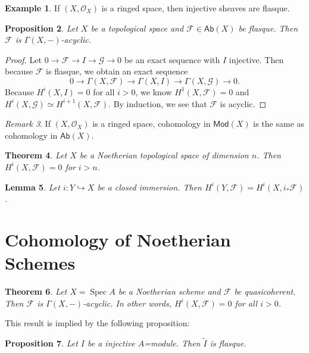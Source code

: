 \documentclass[leqno, openany]{memoir}
\newtheorem{thm}{Theorem}[section]
\newtheorem{prop}[thm]{Proposition}
\newtheorem{lem}[thm]{Lemma}
\theoremstyle{definition}
\newtheorem{exm}[thm]{Example}
\theoremstyle{remark}
\newtheorem{rmk}[thm]{Remark}
\theoremstyle{plain}
\theoremstyle{definition}
\theoremstyle{remark}
\newcommand{\mc}[1]{\mathcal{#1}}
\newcommand{\ms}[1]{\mathsf{#1}}
\newcommand{\wt}[1]{\widetilde{#1}}
\DeclareMathOperator{\Spec}{Spec}
\begin{document}
\begin{exm} If $(X, \mc{O}_X)$ is a ringed space, then injective sheaves are
flasque.  \end{exm}

\begin{prop} Let $X$ be a topological space and $\mc{F} \in \ms{Ab}(X)$ be
flasque. Then $\mc{F}$ is $\Gamma(X,-)$-acyclic.  \end{prop}

\begin{proof} Let $0 \to \mc{F} \to I \to \mc{G} \to 0$ be an exact sequence
    with $I$ injective. Then because $\mc{F}$ is flasque, we obtain an exact
    sequence \[ 0 \to \Gamma(X, \mc{F}) \to \Gamma(X, I) \to \Gamma(X, \mc{G})
    \to 0. \] Because $H^i(X, I) = 0$ for all $i > 0$, we know $H^1(X, \mc{F})
    = 0$ and $H^i(X, \mc{G}) \simeq H^{i+1}(X, \mc{F})$. By induction, we see
    that $\mc{F}$ is acyclic.  \end{proof}

\begin{rmk} If $(X, \mc{O}_X)$ is a ringed space, cohomology in $\ms{Mod}(X)$
is the same as cohomology in $\ms{Ab}(X)$.  \end{rmk}

\begin{thm} Let $X$ be a Noetherian topological space of dimension $n$. Then
$H^i(X, \mc{F}) = 0$ for $i > n$.  \end{thm}

\begin{lem} Let $i \colon Y \hookrightarrow X$ be a closed immersion. Then
$H^i(Y, \mc{F}) = H^i(X, i_* \mc{F})$.  \end{lem}

\section{Cohomology of Noetherian Schemes}%
\label{sec:cohomology_of_noetherian_schemes}

\begin{thm} Let $X = \Spec A$ be a Noetherian scheme and $\mc{F}$ be
quasicoherent. Then $\mc{F}$ is $\Gamma(X,-)$-acyclic. In other words, $H^i(X,
\mc{F}) = 0$ for all $i > 0$.  \end{thm}

This result is implied by the following proposition: \begin{prop} Let $I$ be a
injective $A$=module. Then $\wt{I}$ is flasque.  \end{prop}
\end{document}

